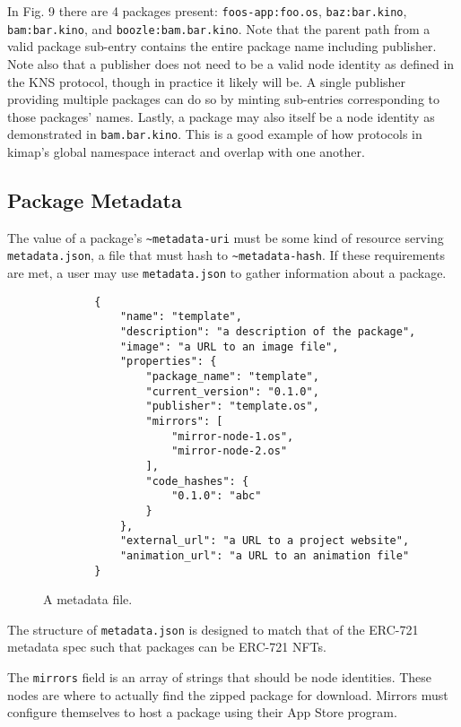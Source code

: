 \documentclass[runningheads]{llncs}
\begin{document}
In Fig. 9 there are 4 packages present: \verb|foos-app:foo.os|, \verb|baz:bar.kino|, \verb|bam:bar.kino|, and \verb|boozle:bam.bar.kino|.
Note that the parent path from a valid package sub-entry contains the entire package name including publisher.
Note also that a publisher does not need to be a valid node identity as defined in the KNS protocol, though in practice it likely will be.
A single publisher providing multiple packages can do so by minting sub-entries corresponding to those packages' names.
Lastly, a package may also itself be a node identity as demonstrated in \verb|bam.bar.kino|.
This is a good example of how protocols in kimap's global namespace interact and overlap with one another.

\subsection{Package Metadata}

The value of a package's \verb|~metadata-uri| must be some kind of resource serving \verb|metadata.json|, a file that must hash to \verb|~metadata-hash|.
If these requirements are met, a user may use \verb|metadata.json| to gather information about a package.

\begin{figure}[H]
    \centering
    \begin{lstlisting}
        {
            "name": "template",
            "description": "a description of the package",
            "image": "a URL to an image file",
            "properties": {
                "package_name": "template",
                "current_version": "0.1.0",
                "publisher": "template.os",
                "mirrors": [
                    "mirror-node-1.os",
                    "mirror-node-2.os"
                ],
                "code_hashes": {
                    "0.1.0": "abc"
                }
            },
            "external_url": "a URL to a project website",
            "animation_url": "a URL to an animation file"
        }
    \end{lstlisting}
    \caption{A metadata file.}
    \label{fig:example metadata.json}
\end{figure}

The structure of \verb|metadata.json| is designed to match that of the ERC-721 metadata spec such that packages can be ERC-721 NFTs.

The \verb|mirrors| field is an array of strings that should be node identities.
These nodes are where to actually find the zipped package for download.
Mirrors must configure themselves to host a package using their App Store program.
\end{document}
